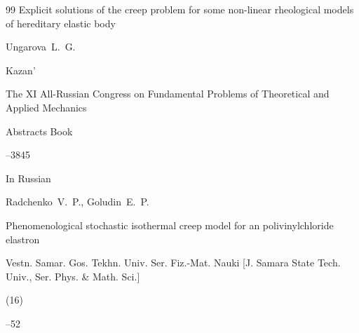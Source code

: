 \begin{thebibliography}{99}
\paper Explicit solutions of the creep problem for some non-linear rheological models of hereditary elastic body

\by Ungarova~L.~G.

\publaddr Kazan'

\inbook  The XI All-Russian Congress on Fundamental Problems of Theoretical and Applied Mechanics

\bookinfo Abstracts Book


--3845






\lang In Russian

\by Radchenko~V.~P., Goludin~E.~P.

\paper Phenomenological stochastic isothermal creep model for an polivinylchloride elastron

\jour Vestn. Samar. Gos. Tekhn. Univ. Ser. Fiz.-Mat. Nauki  \rm [J. Samara State Tech. Univ., Ser. Phys. \& Math. Sci.]


(16)

--52














\end{thebibliography}





\EngDate



\newpage

\Russian





%

